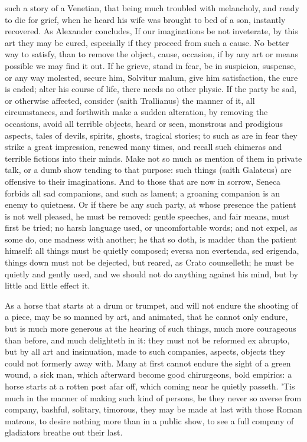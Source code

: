 {such a story of a Venetian, that being much troubled with melancholy,
and ready to die for grief, when he heard his wife was brought to
bed of a son, instantly recovered. As Alexander concludes, If our
imaginations be not inveterate, by this art they may be cured,
especially if they proceed from such a cause. No better way to satisfy,
than to remove the object, cause, occasion, if by any art or means
possible we may find it out. If he grieve, stand in fear, be in
suspicion, suspense, or any way molested, secure him, Solvitur malum,
give him satisfaction, the cure is ended; alter his course of life,
there needs no other physic. If the party be sad, or otherwise
affected, consider (saith Trallianus) the manner of it, all
circumstances, and forthwith make a sudden alteration, by removing the
occasions, avoid all terrible objects, heard or seen, monstrous
and prodigious aspects, tales of devils, spirits, ghosts, tragical
stories; to such as are in fear they strike a great impression, renewed
many times, and recall such chimeras and terrible fictions into their
minds. Make not so much as mention of them in private talk, or a
dumb show tending to that purpose: such things (saith Galateus) are
offensive to their imaginations. And to those that are now in sorrow,
Seneca forbids all sad companions, and such as lament; a groaning
companion is an enemy to quietness. Or if there be any such
party, at whose presence the patient is not well pleased, he must be
removed: gentle speeches, and fair means, must first be tried; no harsh
language used, or uncomfortable words; and not expel, as some do, one
madness with another; he that so doth, is madder than the patient
himself: all things must be quietly composed; eversa non evertenda, sed
erigenda, things down must not be dejected, but reared, as Crato
counselleth;  he must be quietly and gently used, and we should
not do anything against his mind, but by little and little effect it.

As a horse that starts at a drum or trumpet, and will not endure the
shooting of a piece, may be so manned by art, and animated, that he
cannot only endure, but is much more generous at the hearing of such
things, much more courageous than before, and much delighteth in it:
they must not be reformed ex abrupto, but by all art and insinuation,
made to such companies, aspects, objects they could not formerly away
with. Many at first cannot endure the sight of a green wound, a sick
man, which afterward become good chirurgeons, bold empirics: a horse
starts at a rotten post afar off, which coming near he quietly passeth.
'Tis much in the manner of making such kind of persons, be they never
so averse from company, bashful, solitary, timorous, they may be made
at last with those Roman matrons, to desire nothing more than in a
public show, to see a full company of gladiators breathe out their
last.

}
